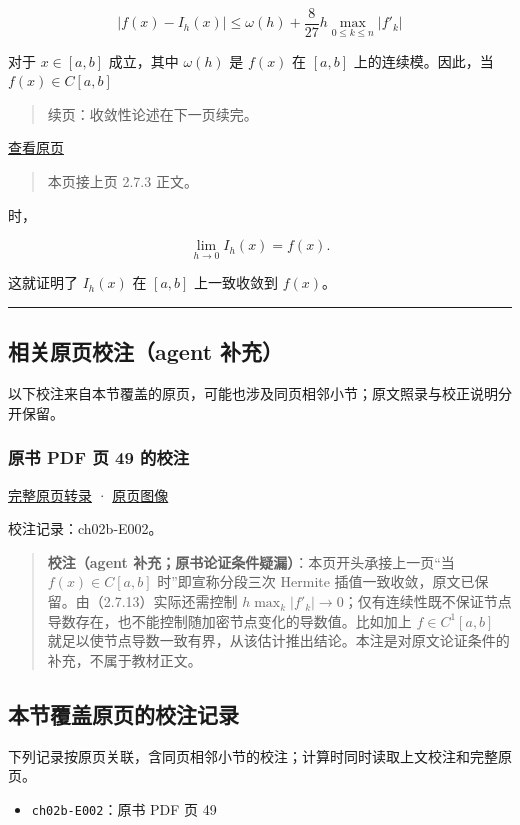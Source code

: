 \documentclass[
  10pt,
  fontset=fandol]{ctexart}
\providecommand{\tightlist}{%
  \setlength{\itemsep}{0pt}\setlength{\parskip}{0pt}}
\begin{document}
\[|f(x)-I_h(x)|\leqslant\omega(h)+\frac{8}{27}h\max_{0\leqslant k\leqslant n}|f'_k|\tag{2.7.13}\]

对于 \(x\in[a,b]\) 成立，其中 \(\omega(h)\) 是 \(f(x)\) 在 \([a,b]\) 上的连续模。因此，当 \(f(x)\in C[a,b]\)

\begin{quote}
续页：收敛性论述在下一页续完。
\end{quote}

\href{../../source-images/pdf-049.jpeg}{查看原页}

\begin{quote}
本页接上页 2.7.3 正文。
\end{quote}

时，

\[\lim_{h\to0}I_h(x)=f(x).\]

这就证明了 \(I_h(x)\) 在 \([a,b]\) 上一致收敛到 \(f(x)\)。

\begin{center}\rule{0.5\linewidth}{0.5pt}\end{center}

\subsection{相关原页校注（agent 补充）}\label{ux76f8ux5173ux539fux9875ux6821ux6ce8agent-ux8865ux5145}

以下校注来自本节覆盖的原页，可能也涉及同页相邻小节；原文照录与校正说明分开保留。

\subsubsection{原书 PDF 页 49 的校注}\label{ux539fux4e66-pdf-ux9875-49-ux7684ux6821ux6ce8}

\href{../pages/pdf-049.md}{完整原页转录} · \href{../../source-images/pdf-049.jpeg}{原页图像}

校注记录：ch02b-E002。

\begin{quote}
\textbf{校注（agent 补充；原书论证条件疑漏）}：本页开头承接上一页``当 \(f(x)\in C[a,b]\) 时''即宣称分段三次 Hermite 插值一致收敛，原文已保留。由（2.7.13）实际还需控制 \(h\max_k|f'_k|\to0\)；仅有连续性既不保证节点导数存在，也不能控制随加密节点变化的导数值。比如加上 \(f\in C^1[a,b]\) 就足以使节点导数一致有界，从该估计推出结论。本注是对原文论证条件的补充，不属于教材正文。
\end{quote}

\subsection{本节覆盖原页的校注记录}\label{ux672cux8282ux8986ux76d6ux539fux9875ux7684ux6821ux6ce8ux8bb0ux5f55}

下列记录按原页关联，含同页相邻小节的校注；计算时同时读取上文校注和完整原页。

\begin{itemize}
\tightlist
\item
  \texttt{ch02b-E002}：原书 PDF 页 49
\end{itemize}
\end{document}
